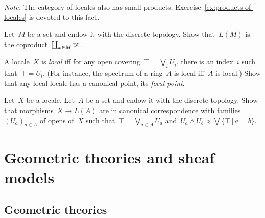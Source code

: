 \documentclass{ws-rv9x6}
\begin{document}
{\begin{exercise}
\begin{alphlist}[(c)]
{\scriptsize\emph{Note.} The category of locales also has small products;
Exercise~\ref{ex:products-of-locales} is devoted to this fact.\par}
\item Let~$M$ be a set and endow it with the discrete topology. Show
that~$L(M)$ is the coproduct~$\coprod_{x \in M} \mathrm{pt}$.
\end{alphlist}
\end{exercise}

\begin{exercise}%
\label{ex:local-locales}%
A locale~$X$ is \emph{local} iff for any open covering~$\top = \bigvee_i U_i$,
there is an index~$i$ such that~$\top = U_i$. (For instance, the spectrum of a
ring~$A$ is local iff~$A$ is local.)
Show that any local locale has a canonical point, its \emph{focal point}.
\end{exercise}

\begin{exercise}%
Let~$X$ be a locale. Let~$A$ be a set and endow it with the discrete topology. Show
that morphisms~$X \to L(A)$ are in canonical correspondence with
families~$(U_a)_{a \in A}$ of opens of~$X$ such that~$\top = \bigvee_{a \in A}
U_a$ and~$U_a \wedge U_b \preceq \bigvee\{ \top \,|\, a = b \}$.
\end{exercise}


\section{Geometric theories and sheaf models}

\subsection{Geometric theories}
\label{sect:geometric-theories}

}
\end{document}
